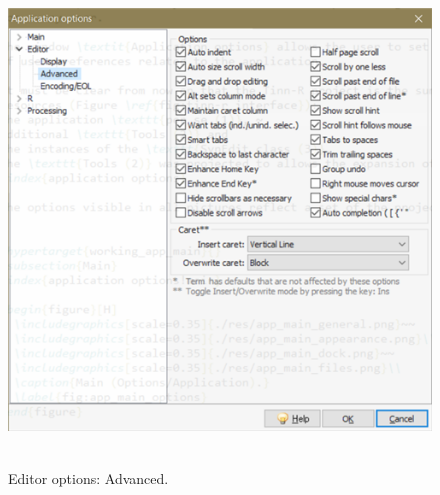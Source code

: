 \begin{figure}[H]
  \includegraphics[scale=0.8]{./res/app_editor_advanced.png}~~
  \caption{Editor options: Advanced.}
  \label{fig:editor_advanced}
\end{figure}

